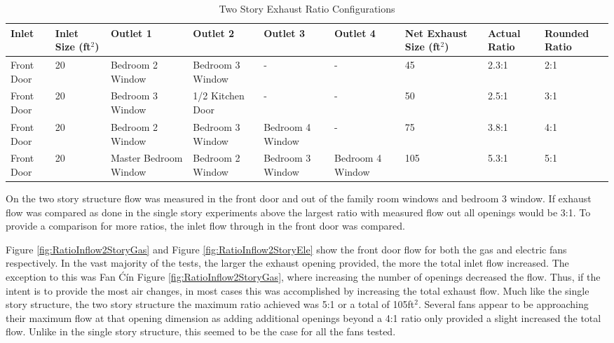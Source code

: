 \documentclass{article}
\begin{document}
\begin{table}[H]
	\centering
	\caption {Two Story Exhaust Ratio Configurations}
	\begin{tabular}{|C{.45in}|C{.6in}|C{.7in}|C{.7in}|C{.7in}|C{.7in}|C{.6in}|C{.45in}|C{.5in}|}
		\hline
		Inlet & Inlet Size (ft$^2$) & Outlet 1 & Outlet 2 & Outlet 3 & Outlet 4 & Net Exhaust Size (ft$^2$) & Actual Ratio & Rounded Ratio \\ \hline \hline
		Front Door & 20 & Bedroom 2 Window & Bedroom 3 Window & - & - & 45 & 2.3:1 & 2:1 \\ \hline
		Front Door & 20 & Bedroom 3 Window & 1/2 Kitchen Door & - & - & 50 & 2.5:1 & 3:1 \\ \hline
		Front Door & 20 & Bedroom 2 Window & Bedroom 3 Window & Bedroom 4 Window & - & 75 & 3.8:1 & 4:1 \\ \hline
		Front Door & 20 & Master Bedroom Window & Bedroom 2 Window & Bedroom 3 Window & Bedroom 4 Window & 105 & 5.3:1 & 5:1 \\ \hline
	\end{tabular}
	\label{table:RatioExhaustComp_2Story}
\end{table}

On the two story structure flow was measured in the front door and out of the family room windows and bedroom 3 window. If exhaust flow was compared as done in the single story experiments above the largest ratio with measured flow out all openings would be 3:1. To provide a comparison for more ratios, the inlet flow through in the front door was compared. 

Figure \ref{fig:RatioInflow2StoryGas} and Figure \ref{fig:RatioInflow2StoryEle} show the front door flow for both the gas and electric fans respectively. In the vast majority of the tests, the larger the exhaust opening provided, the more the total inlet flow increased. The exception to this was Fan \'C\' in Figure \ref{fig:RatioInflow2StoryGas}, where increasing the number of openings decreased the flow. Thus, if the intent is to provide the most air changes, in most cases this was accomplished by increasing the total exhaust flow. Much like the single story structure, the two story structure the maximum ratio achieved was 5:1 or a total of 105ft$^2$. Several fans appear to be approaching their maximum flow at that opening dimension as adding additional openings beyond a 4:1 ratio only provided a slight increased the total flow. Unlike in the single story structure, this seemed to be the case for all the fans tested. 
\end{document}
